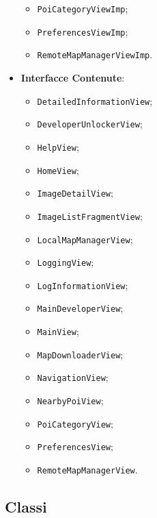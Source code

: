 \documentclass[../DefinizioneDiProdotto.tex]{subfiles}
\begin{document}
\begin{itemize}
\begin{itemize}
\item \texttt{PoiCategoryViewImp};

\item \texttt{PreferencesViewImp};

\item \texttt{RemoteMapManagerViewImp}.

\end{itemize}
\item \textbf{Interfacce Contenute}:
\begin{itemize}
\item \texttt{DetailedInformationView};

\item \texttt{DeveloperUnlockerView};

\item \texttt{HelpView};

\item \texttt{HomeView};

\item \texttt{ImageDetailView};

\item \texttt{ImageListFragmentView};

\item \texttt{LocalMapManagerView};

\item \texttt{LoggingView};

\item \texttt{LogInformationView};

\item \texttt{MainDeveloperView};

\item \texttt{MainView};

\item \texttt{MapDownloaderView};

\item \texttt{NavigationView};

\item \texttt{NearbyPoiView};

\item \texttt{PoiCategoryView};

\item \texttt{PreferencesView};

\item \texttt{RemoteMapManagerView}.

\end{itemize}
\end{itemize}
\subsection{Classi}
\end{document}

